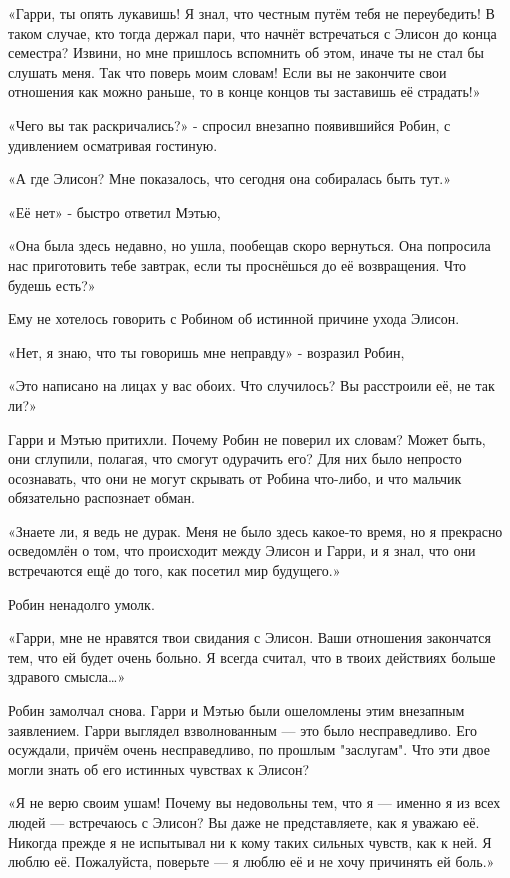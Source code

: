 \documentclass[a4paper,12pt]{book}
\begin{document}
\par
«Гарри, ты опять лукавишь! Я знал, что честным путём тебя не переубедить! В таком случае, кто тогда держал пари, что начнёт встречаться с Элисон до конца семестра? Извини, но мне пришлось вспомнить об этом, иначе ты не стал бы слушать меня. Так что поверь моим словам! Если вы не закончите свои отношения как можно раньше, то в конце концов ты заставишь её страдать!»
\par
«Чего вы так раскричались?» - спросил внезапно появившийся Робин, с удивлением осматривая гостиную.
\par
«А где Элисон? Мне показалось, что сегодня она собиралась быть тут.»
\par
«Её нет» - быстро ответил Мэтью,
\par
«Она была здесь недавно, но ушла, пообещав скоро вернуться. Она попросила нас приготовить тебе завтрак, если ты проснёшься до её возвращения. Что будешь есть?»
\par
Ему не хотелось говорить с Робином об истинной причине ухода Элисон.
\par
«Нет, я знаю, что ты говоришь мне неправду» - возразил Робин,
\par
«Это написано на лицах у вас обоих. Что случилось? Вы расстроили её, не так ли?»
\par
Гарри и Мэтью притихли. Почему Робин не поверил их словам? Может быть, они сглупили, полагая, что смогут одурачить его? Для них было непросто осознавать, что они не могут скрывать от Робина что-либо, и что мальчик обязательно распознает обман.
\par
«Знаете ли, я ведь не дурак. Меня не было здесь какое-то время, но я прекрасно осведомлён о том, что происходит между Элисон и Гарри, и я знал, что они встречаются ещё до того, как посетил мир будущего.»
\par
Робин ненадолго умолк.
\par
«Гарри, мне не нравятся твои свидания с Элисон. Ваши отношения закончатся тем, что ей будет очень больно. Я всегда считал, что в твоих действиях больше здравого смысла…»
\par
Робин замолчал снова. Гарри и Мэтью были ошеломлены этим внезапным заявлением. Гарри выглядел взволнованным — это было несправедливо. Его осуждали, причём очень несправедливо, по прошлым "заслугам". Что эти двое могли знать об его истинных чувствах к Элисон?
\par
«Я не верю своим ушам! Почему вы недовольны тем, что я — именно я из всех людей — встречаюсь с Элисон? Вы даже не представляете, как я уважаю её. Никогда прежде я не испытывал ни к кому таких сильных чувств, как к ней. Я люблю её. Пожалуйста, поверьте — я люблю её и не хочу причинять ей боль.»
\end{document}
